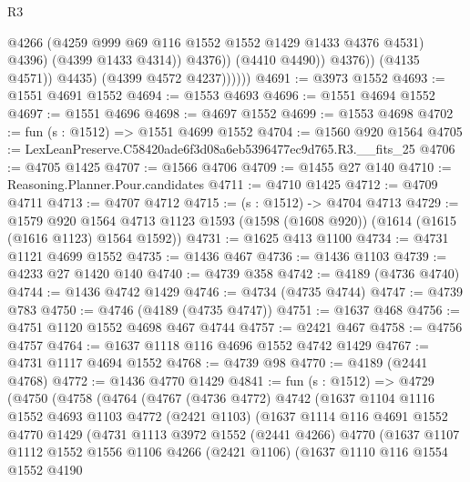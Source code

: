 \begin{lexlean}{R3}
\begin{coremodule}
                                @4266
                                (@4259 @999 @69 @116 @1552 @1552 @1429 @1433 @4376 @4531)
                                @4396)
                              (@4399 @1433 @4314))
                            @4376))
                        (@4410 @4490))
                      @4376))
                  (@4135 @4571))
                @4435)
              (@4399 @4572 @4237))))))
@4691 := @3973 @1552
@4693 := @1551 @4691 @1552
@4694 := @1553 @4693
@4696 := @1551 @4694 @1552
@4697 := @1551 @4696
@4698 := @4697 @1552
@4699 := @1553 @4698
@4702 := fun (s : @1512) => @1551 @4699 @1552
@4704 := @1560 @920 @1564
@4705 := LexLeanPreserve.C58420ade6f3d08a6eb5396477ec9d765.R3.__fits_25
@4706 := @4705 @1425
@4707 := @1566 @4706
@4709 := @1455 @27 @140
@4710 := Reasoning.Planner.Pour.candidates
@4711 := @4710 @1425
@4712 := @4709 @4711
@4713 := @4707 @4712
@4715 := (s : @1512) -> @4704 @4713
@4729 := @1579
    @920
    @1564
    @4713
    @1123
    @1593
    (@1598 (@1608 @920))
    (@1614 (@1615 (@1616 @1123) @1564 @1592))
@4731 := @1625 @413 @1100
@4734 := @4731 @1121 @4699 @1552
@4735 := @1436 @467
@4736 := @1436 @1103
@4739 := @4233 @27 @1420 @140
@4740 := @4739 @358
@4742 := @4189 (@4736 @4740)
@4744 := @1436 @4742 @1429
@4746 := @4734 (@4735 @4744)
@4747 := @4739 @783
@4750 := @4746 (@4189 (@4735 @4747))
@4751 := @1637 @468
@4756 := @4751 @1120 @1552 @4698 @467 @4744
@4757 := @2421 @467
@4758 := @4756 @4757
@4764 := @1637 @1118 @116 @4696 @1552 @4742 @1429
@4767 := @4731 @1117 @4694 @1552
@4768 := @4739 @98
@4770 := @4189 (@2441 @4768)
@4772 := @1436 @4770 @1429
@4841 := fun (s : @1512) =>
  @4729
    (@4750
      (@4758
        (@4764
          (@4767
            (@4736 @4772)
            @4742
            (@1637
              @1104
              @1116
              @1552
              @4693
              @1103
              @4772
              (@2421 @1103)
              (@1637
                @1114
                @116
                @4691
                @1552
                @4770
                @1429
                (@4731
                  @1113
                  @3972
                  @1552
                  (@2441 @4266)
                  @4770
                  (@1637
                    @1107
                    @1112
                    @1552
                    @1556
                    @1106
                    @4266
                    (@2421 @1106)
                    (@1637
                      @1110
                      @116
                      @1554
                      @1552
                      @4190

\end{coremodule}
\end{lexlean}
